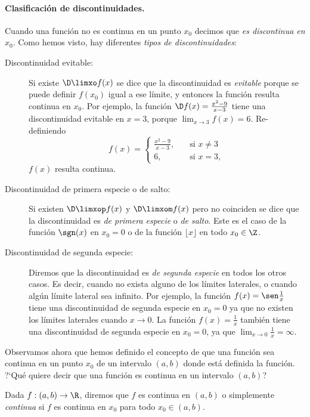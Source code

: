 \paragraph{Clasificación de discontinuidades.}
Cuando una función no es continua en un punto $x_0$ decimos que \emph{es discontinua en $x_0$}.
Como hemos visto, hay diferentes \emph{tipos de discontinuidades}:
\begin{description}
    \item[Discontinuidad evitable:]
    Si existe $\D\limxo f(x)$ se dice que la discontinuidad es \emph{evitable} porque se puede definir $f(x_0)$ igual a ese límite, y entonces la función resulta continua en $x_0$.
    Por ejemplo, la función $\D f(x) = \frac{x^2-9}{x-3}$ tiene una discontinuidad evitable en $x=3$, porque $\lim_{x\to3}f(x) = 6$. Re-definiendo 
    \[
    f(x) = \begin{cases} \frac{x^2-9}{x-3}, \quad&\text{si $x\neq 3$}\\
    6, \quad&\text{si $x=3$},
    \end{cases}
    \]
    $f(x)$ resulta continua.

    \item[Discontinuidad de primera especie o de salto:]
Si existen $\D\limxop f(x)$ y $\D\limxom f(x)$ pero no coinciden se dice que la discontinuidad es \emph{de primera especie} o \emph{de salto}. Este es el caso de la función $\sgn(x)$ en $x_0=0$ o de la función $\lfloor x \rfloor$ en todo $x_0\in\Z$.

    \item[Discontinuidad de segunda especie:]
    Diremos que la discontinuidad es \emph{de segunda especie} en todos los otros casos.
    Es decir, cuando no exista alguno de los límites laterales, o cuando algún límite lateral sea infinito.
    Por ejemplo, la función $f(x) = \sen\frac1x$ tiene una discontinuidad de segunda especie en $x_0=0$ ya que no existen los límites laterales cuando $x\to 0$.
    La función $f(x) = \frac1x$ también tiene una discontinuidad de segunda especie en $x_0=0$, ya que $\lim_{x\to 0}\frac1x = \infty$.
        
    
\end{description}

Observamos ahora que hemos definido el concepto de que una función sea continua en un punto $x_0$ de un intervalo $(a,b)$ donde está definida la función. ?`Qué quiere decir que una función es continua en un intervalo $(a,b)$?


\begin{definition}
Dada $f:(a,b)\to \R$, diremos que $f$ es continua en $(a,b)$ o simplemente \emph{continua} si $f$ es continua en $x_0$ para todo $x_0\in(a,b)$.
\end{definition}



